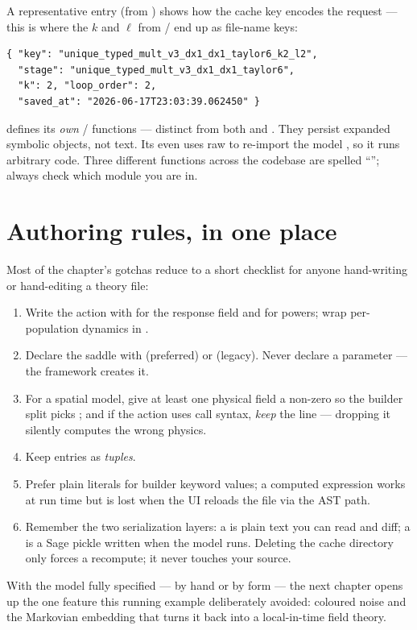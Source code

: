 A representative  entry (from
) shows how the cache key encodes
the request --- this is where the $k$ and $\ell$ from /
end up as file-name keys:

\begin{lstlisting}[style=console]
{ "key": "unique_typed_mult_v3_dx1_dx1_taylor6_k2_l2",
  "stage": "unique_typed_mult_v3_dx1_dx1_taylor6",
  "k": 2, "loop_order": 2,
  "saved_at": "2026-06-17T23:03:39.062450" }
\end{lstlisting}

\begin{gotcha}
 defines its \emph{own}  /
 functions --- distinct from both 
and . They persist expanded symbolic objects, not
 text. Its  even uses raw  to
re-import the model , so it runs arbitrary code. Three different
functions across the codebase are spelled ``''; always check
which module you are in.
\end{gotcha}

\section{Authoring rules, in one place}

Most of the chapter's gotchas reduce to a short checklist for anyone hand-writing
or hand-editing a theory file:

\begin{enumerate}
  \item Write the action with  for the response field and \code{\^{}} for
        powers; wrap per-population dynamics in .
  \item Declare the saddle with  (preferred)
        or  (legacy). Never declare a
         parameter --- the framework creates it.
  \item For a spatial model, give at least one physical field a non-zero
         so the builder split picks
        ; and if the action uses 
        call syntax, \emph{keep} the  line --- dropping it
        silently computes the wrong physics.
  \item Keep  entries as \emph{tuples}.
  \item Prefer plain literals for builder keyword values; a computed expression
        works at run time but is lost when the UI reloads the file via the AST
        path.
  \item Remember the two serialization layers: a  is plain
        text you can read and diff; a  is a
        Sage pickle written when the model runs. Deleting the cache directory only
        forces a recompute; it never touches your source.
\end{enumerate}

With the model fully specified --- by hand or by form --- the next chapter opens up
the one feature this running example deliberately avoided: coloured noise and the
Markovian embedding that turns it back into a local-in-time field theory.
